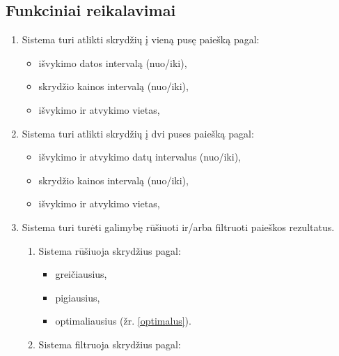 \documentclass{VUMIFPSkursinis}
\begin{document}
            \subsection{Funkciniai reikalavimai}
                \begin{enumerate}[label=\textbf{FR\arabic*}.]
                	\subsubsection{Bendri sistemos funkciniai reikalavimai}
                		\item \label{viena_puse} Sistema turi atlikti skrydžių į vieną pusę paiešką pagal:
						\begin{itemize}
                    		\item išvykimo datos intervalą (nuo/iki),
                    		\item skrydžio kainos intervalą (nuo/iki),
                    		\item išvykimo ir atvykimo vietas,
                    	\end{itemize}
						\item Sistema turi atlikti skrydžių į dvi puses paiešką pagal:
                    	\begin{itemize}
                    		\item išvykimo ir atvykimo datų intervalus (nuo/iki),
                    		\item skrydžio kainos intervalą (nuo/iki),
                    		\item išvykimo ir atvykimo vietas,
                    	\end{itemize}
                    	\item Sistema turi turėti galimybę rūšiuoti ir/arba  filtruoti paieškos rezultatus.
                    	\begin{enumerate}[label*=\textbf{\arabic*}.]
                        	\item Sistema rūšiuoja skrydžius pagal:
                        	\begin{itemize}
                            	\item greičiausius,
                            	\item pigiausius,
                            	\item optimaliausius (žr. \ref{optimalus}).
                        	\end{itemize}
                        	\item Sistema filtruoja skrydžius pagal:

\end{enumerate}
\end{enumerate}
\end{document}
